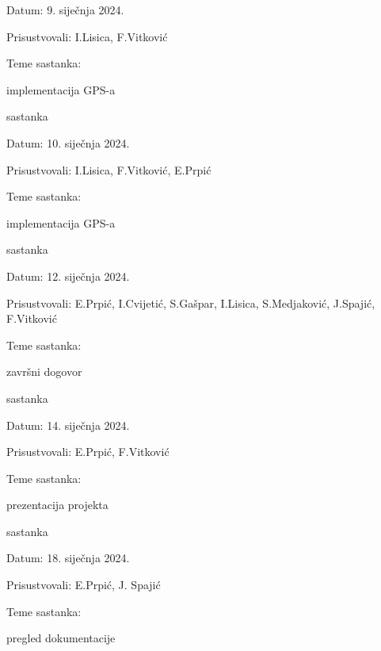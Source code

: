 \begin{packed_enum}
			\item[] \begin{packed_item}
				\item Datum: 9. siječnja 2024.
				\item Prisustvovali: I.Lisica, F.Vitković
				\item Teme sastanka:
				\begin{packed_item}
					\item  implementacija GPS-a
				\end{packed_item}
			\end{packed_item}
			\item  sastanka
			\item[] \begin{packed_item}
				\item Datum: 10. siječnja 2024.
				\item Prisustvovali: I.Lisica, F.Vitković, E.Prpić
				\item Teme sastanka:
				\begin{packed_item}
					\item  implementacija GPS-a
				\end{packed_item}
			\end{packed_item}
			\item  sastanka
			\item[] \begin{packed_item}
				\item Datum: 12. siječnja 2024.
				\item Prisustvovali: E.Prpić, I.Cvijetić, S.Gašpar, I.Lisica, S.Medjaković, J.Spajić, F.Vitković
				\item Teme sastanka:
				\begin{packed_item}
					\item  završni dogovor 
				\end{packed_item}
			\end{packed_item}
			\item  sastanka
			\item[] \begin{packed_item}
				\item Datum: 14. siječnja 2024.
				\item Prisustvovali: E.Prpić, F.Vitković
				\item Teme sastanka:
				\begin{packed_item}
					\item  prezentacija projekta
				\end{packed_item}
			\end{packed_item}
			\item  sastanka
			\item[] \begin{packed_item}
				\item Datum: 18. siječnja 2024.
				\item Prisustvovali: E.Prpić, J. Spajić
				\item Teme sastanka:
				\begin{packed_item}
					\item  pregled dokumentacije
				\end{packed_item}
			\end{packed_item}
			

\end{packed_enum}
